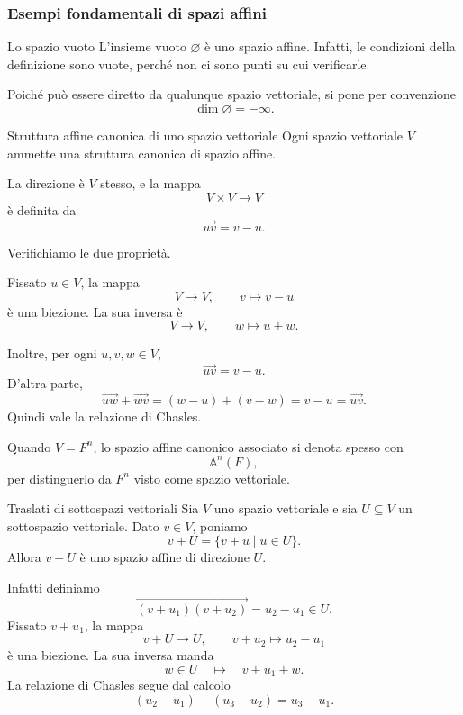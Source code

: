 \documentclass[a4paper]{article}
\begin{document}
\subsubsection{Esempi fondamentali di spazi affini}

\begin{snippetexample}{Lo spazio vuoto}
    L'insieme vuoto \(\varnothing\) è uno spazio affine. Infatti, le condizioni della definizione sono vuote, perché non ci sono punti su cui verificarle.

    Poiché può essere diretto da qualunque spazio vettoriale, si pone per convenzione
    \[
        \dim \varnothing=-\infty.
    \]
\end{snippetexample}

\begin{snippetexample}{Struttura affine canonica di uno spazio vettoriale}
    Ogni spazio vettoriale \(V\) ammette una struttura canonica di spazio affine.

    La direzione è \(V\) stesso, e la mappa
    \[
        V\times V\to V
    \]
    è definita da
    \[
        \overrightarrow{uv}=v-u.
    \]

    Verifichiamo le due proprietà.

    Fissato \(u\in V\), la mappa
    \[
        V\to V,
        \qquad
        v\mapsto v-u
    \]
    è una biezione. La sua inversa è
    \[
        V\to V,
        \qquad
        w\mapsto u+w.
    \]

    Inoltre, per ogni \(u,v,w\in V\),
    \[
        \overrightarrow{uv}=v-u.
    \]
    D'altra parte,
    \[
        \overrightarrow{uw}+\overrightarrow{wv}
        =
        (w-u)+(v-w)
        =
        v-u
        =
        \overrightarrow{uv}.
    \]
    Quindi vale la relazione di Chasles.
\end{snippetexample}

Quando \(V=F^n\), lo spazio affine canonico associato si denota spesso con
\[
    \mathbb{A}^n(F),
\]
per distinguerlo da \(F^n\) visto come spazio vettoriale.

\begin{snippetexample}{Traslati di sottospazi vettoriali}
    Sia \(V\) uno spazio vettoriale e sia \(U\subseteq V\) un sottospazio vettoriale. Dato \(v\in V\), poniamo
    \[
        v+U=\{v+u\mid u\in U\}.
    \]
    Allora \(v+U\) è uno spazio affine di direzione \(U\).

    Infatti definiamo
    \[
        \overrightarrow{(v+u_1)(v+u_2)}
        =
        u_2-u_1
        \in U.
    \]
    Fissato \(v+u_1\), la mappa
    \[
        v+U\to U,
        \qquad
        v+u_2\mapsto u_2-u_1
    \]
    è una biezione. La sua inversa manda
    \[
        w\in U
        \quad\longmapsto\quad
        v+u_1+w.
    \]
    La relazione di Chasles segue dal calcolo
    \[
        (u_2-u_1)+(u_3-u_2)=u_3-u_1.
    \]
\end{snippetexample}
\end{document}
